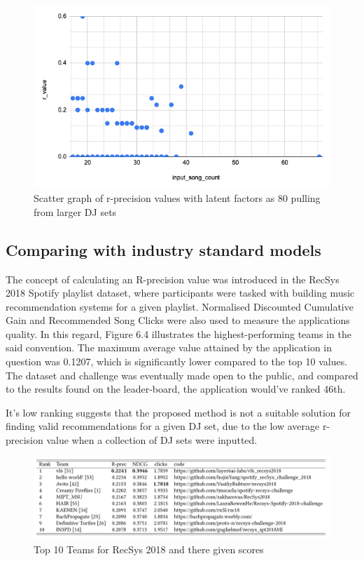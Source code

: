 \begin{figure}[H]
	\includegraphics[scale=0.6]{images/80_big_sets}
	\centering
	\caption{Scatter graph of r-precision values with latent factors as 80 pulling from larger DJ sets} 
\end{figure}


\subsection{Comparing with industry standard models}

The concept of calculating an R-precision value was introduced in the RecSys 2018 Spotify playlist dataset, where participants were tasked with building music recommendation systems for a given playlist. Normalised Discounted Cumulative Gain and Recommended Song Clicks were also used to measure the applications quality. In this regard, Figure 6.4 illustrates the highest-performing teams in the said convention. The maximum average value attained by the application in question was 0.1207, which is significantly lower compared to the top 10 values. The dataset and challenge was eventually made open to the public, and compared to the results found on the leader-board, the application would've ranked 46th. 

It's low ranking suggests that the proposed method is not a suitable solution for finding valid recommendations for a given DJ set, due to the low average r-precision value when a collection of DJ sets were inputted.
\begin{figure}[H]
	\hspace*{-1cm} 
	\includegraphics[scale=0.6]{images/recsys_scores}
	\caption{Top 10 Teams for RecSys 2018 and there given scores} 
\end{figure}

